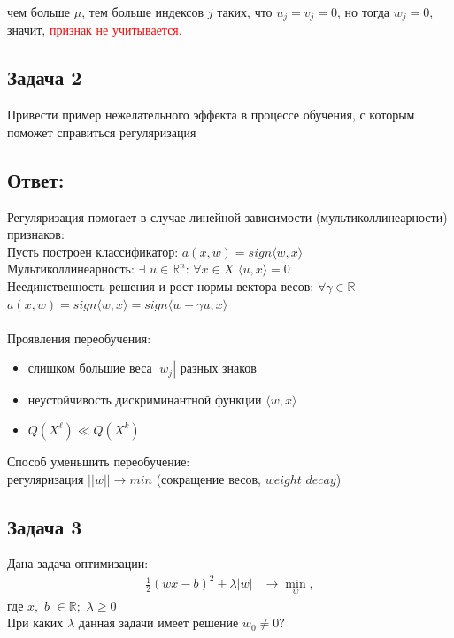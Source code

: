 чем больше \(\mu\), тем больше индексов \(j\) таких, что \(u_j = v_j = 0\), но тогда \(w_j = 0\), значит, \textcolor{red}{признак не учитывается.}

\subsection{Задача 2}

Привести пример нежелательного эффекта в процессе обучения, с которым поможет справиться регуляризация 
 
\subsection{Ответ:}

Регуляризация помогает в случае линейной зависимости (мультиколлинеарности) признаков:\\
Пусть построен классификатор: $a(x, w) = sign\langle w, x \rangle$ \\
Мультиколлинеарность: $\exists$  $u \in \mathbb{R}^{n}$: $\forall x \in X$ $\langle u, x \rangle = 0$ \\
Неединственность решения и рост нормы вектора весов: $\forall \gamma \in \mathbb{R}$ $a(x, w) = sign\langle w, x \rangle = sign \langle w + \gamma u, x \rangle$ \\
\\
Проявления переобучения:
\begin{itemize}
    \item слишком большие веса $|w_j|$ разных знаков
    \item неустойчивость дискриминантной функции $\langle w, x \rangle$
    \item $Q(X^{\ell}) \ll Q(X^{k})$
\end{itemize}
Способ уменьшить переобучение:\\
регуляризация $||w|| \rightarrow min$ (сокращение весов, $weight$ $decay$)

\subsection{Задача 3}

Дана задача оптимизации:
\begin{align*}
    \frac{1}{2}(wx - b)^2 + \lambda|w| & \rightarrow \min_{w},
\end{align*}
где $x,$ $b$ $\in \mathbb{R};$ $\lambda \geq 0$\\
При каких $\lambda$ данная задачи имеет решение $w_0 \neq 0?$
 
